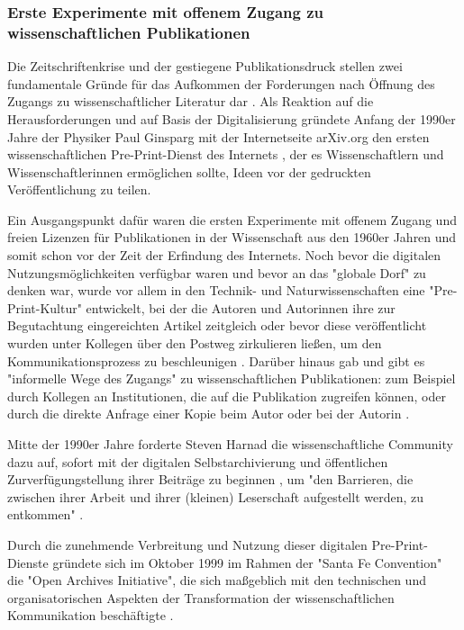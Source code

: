 \subsubsection{Erste Experimente mit offenem Zugang zu wissenschaftlichen Publikationen}

Die Zeitschriftenkrise und der gestiegene Publikationsdruck stellen zwei fundamentale Gründe für das Aufkommen der Forderungen nach Öffnung des Zugangs zu wissenschaftlicher Literatur dar \cite{Brintzinger_2010} \cite{Wein_2010}. Als Reaktion auf die Herausforderungen und auf Basis der Digitalisierung gründete Anfang der 1990er Jahre der Physiker Paul Ginsparg mit der Internetseite arXiv.org den ersten wissenschaftlichen Pre-Print-Dienst des Internets \cite{Willinsky_2006} \cite{Bjoerk_2004}, der es Wissenschaftlern und Wissenschaftlerinnen ermöglichen sollte, Ideen vor der gedruckten Veröffentlichung zu teilen.

Ein Ausgangspunkt dafür waren die ersten Experimente mit offenem Zugang und freien Lizenzen für Publikationen in der Wissenschaft aus den 1960er Jahren und somit schon vor der Zeit der Erfindung des Internets. Noch bevor die digitalen Nutzungsmöglichkeiten verfügbar waren und bevor an das "globale Dorf" \cite{McLuhan_1962} zu denken war, wurde vor allem in den Technik- und Naturwissenschaften eine "Pre-Print-Kultur" entwickelt, bei der die Autoren und Autorinnen ihre zur Begutachtung eingereichten Artikel zeitgleich oder bevor diese veröffentlicht wurden unter Kollegen über den Postweg zirkulieren ließen, um den Kommunikationsprozess zu beschleunigen \cite[:6]{Hofmann_2015}. Darüber hinaus gab und gibt es "informelle Wege des Zugangs" zu wissenschaftlichen Publikationen: zum Beispiel durch Kollegen an Institutionen, die auf die Publikation zugreifen können, oder durch die direkte Anfrage einer Kopie beim Autor oder bei der Autorin \cite{Davis_2011}.

Mitte der 1990er Jahre forderte Steven Harnad die wissenschaftliche Community dazu auf, sofort mit der digitalen Selbstarchivierung und öffentlichen Zurverfügungstellung ihrer Beiträge zu beginnen \cite{Albert_2006}, um "den Barrieren, die zwischen ihrer Arbeit und ihrer (kleinen) Leserschaft aufgestellt werden, zu entkommen" \cite{Harnad_1995}.

Durch die zunehmende Verbreitung und Nutzung dieser digitalen Pre-Print-Dienste gründete sich im Oktober 1999 im Rahmen der "Santa Fe Convention" die "Open Archives Initiative", die sich maßgeblich mit den technischen und organisatorischen Aspekten der Transformation der wissenschaftlichen Kommunikation beschäftigte \cite{van_de_Sompel_2000}.

